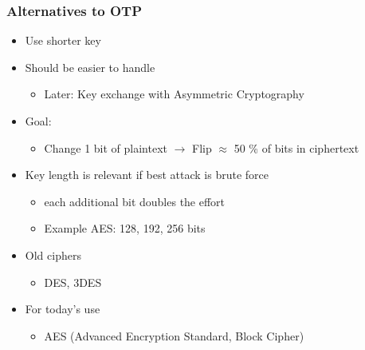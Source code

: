\subsubsection{Alternatives to OTP}
\begin{itemize}
  \item Use shorter key
  \item Should be easier to handle
        \begin{itemize}
          \item Later: Key exchange with Asymmetric Cryptography
        \end{itemize}
  \item Goal:
        \begin{itemize}
          \item Change 1 bit of plaintext $\rightarrow$ Flip $\approx$ 50 \% of bits in ciphertext
        \end{itemize}
  \item Key length is relevant if best attack is brute force
        \begin{itemize}
          \item each additional bit doubles the effort
          \item Example AES: 128, 192, 256 bits
        \end{itemize}
  \item Old ciphers
        \begin{itemize}
          \item DES, 3DES
        \end{itemize}
  \item For today's use
        \begin{itemize}
          \item AES (Advanced Encryption Standard, Block Cipher)
        \end{itemize}
\end{itemize}


